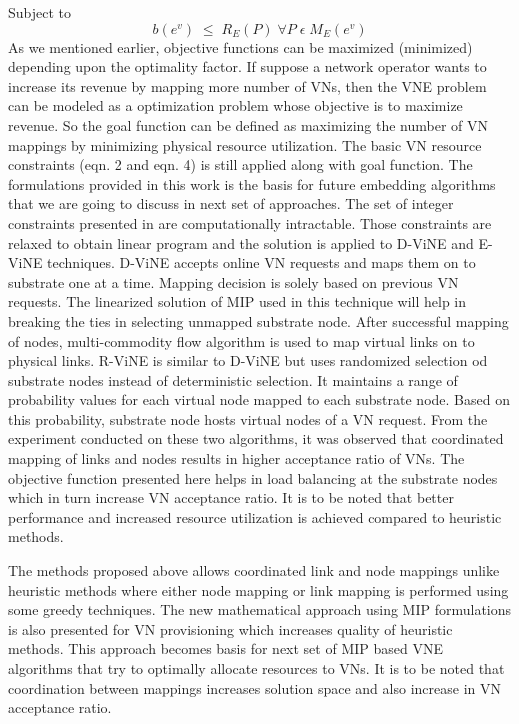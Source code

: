 \documentclass[article,dr=phil,type=msc ,colorback,accentcolor=tud4b]{tudthesis}
\begin{document}
Subject to 
\begin{equation}
b(e^{v})  \; \leq \; R_{E}(P) \;\forall P \;\epsilon \;M_{E}(e^{v})
\end{equation}
As we mentioned earlier, objective functions can be maximized (minimized) depending upon the optimality factor. If suppose a network operator wants to increase its revenue by mapping more number of VNs, then the VNE problem can be modeled as a optimization problem whose objective is to maximize revenue. So the goal function can be defined as maximizing the number of VN mappings by minimizing physical resource utilization. The basic VN resource constraints (eqn. 2 and eqn. 4) is still applied along with goal function. The formulations provided in this work is the basis for future embedding algorithms that we are going to discuss in next set of approaches. The set of integer constraints presented in \cite{coord_map} are computationally intractable. Those constraints are relaxed to obtain linear program and the solution is applied to D-ViNE and E-ViNE techniques. D-ViNE accepts online VN requests and maps them on to substrate one at a time. Mapping decision is solely based on previous VN requests. The linearized solution of MIP used in this technique will help in breaking the ties in selecting unmapped substrate node. After successful mapping of nodes, multi-commodity flow algorithm is used to map virtual links on to physical links.\newline
\hspace*{1cm}R-ViNE is similar to D-ViNE but uses randomized selection od substrate nodes instead of deterministic selection. It maintains a range of probability values for each virtual node mapped to each substrate node. Based on this probability, substrate node hosts virtual nodes of a VN request. From the experiment conducted on these two algorithms, it was observed that coordinated mapping of links and nodes results in higher acceptance ratio of VNs. The objective function presented here helps in load balancing at the substrate nodes which in turn increase VN acceptance ratio. It is to be noted that better performance and increased resource utilization is achieved compared to heuristic methods.\newline

The methods proposed above allows coordinated link and node mappings unlike heuristic methods where either node mapping or link mapping is performed using some greedy techniques. The new mathematical approach using MIP formulations is also presented for VN provisioning which increases quality of heuristic methods. This approach becomes basis for next set of MIP based VNE algorithms that try to optimally allocate resources to VNs. It is to be noted that coordination between mappings increases solution space and also increase in VN acceptance ratio. \newline
\end{document}
